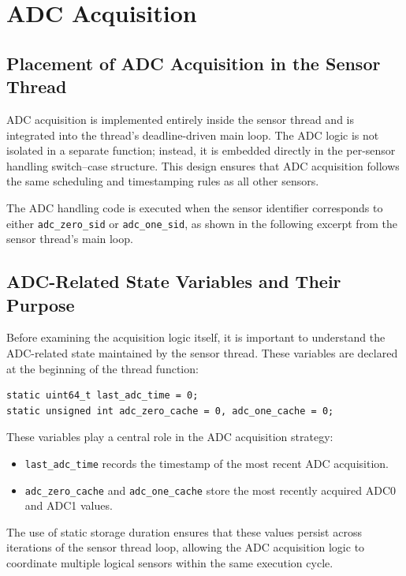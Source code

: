 \section{ADC Acquisition}
\subsection{Placement of ADC Acquisition in the Sensor Thread}
ADC acquisition is implemented entirely inside the sensor thread and is integrated into the thread’s deadline-driven main loop. The ADC logic is not isolated in a separate function; instead, it is embedded directly in the per-sensor handling switch–case structure. This design ensures that ADC acquisition follows the same scheduling and timestamping rules as all other sensors.

The ADC handling code is executed when the sensor identifier corresponds to either \texttt{adc\_zero\_sid} or \texttt{adc\_one\_sid}, as shown in the following excerpt from the sensor thread’s main loop.


\subsection{ADC-Related State Variables and Their Purpose}
Before examining the acquisition logic itself, it is important to understand the ADC-related state maintained by the sensor thread. These variables are declared at the beginning of the thread function:

\begin{verbatim}
static uint64_t last_adc_time = 0;
static unsigned int adc_zero_cache = 0, adc_one_cache = 0;
\end{verbatim}

These variables play a central role in the ADC acquisition strategy:

\begin{itemize}
    \item \texttt{last\_adc\_time} records the timestamp of the most recent ADC acquisition.
    \item \texttt{adc\_zero\_cache} and \texttt{adc\_one\_cache} store the most recently acquired ADC0 and ADC1 values.
\end{itemize}
The use of static storage duration ensures that these values persist across iterations of the sensor thread loop, allowing the ADC acquisition logic to coordinate multiple logical sensors within the same execution cycle.

